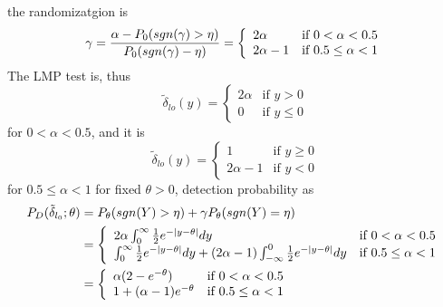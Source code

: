 \documentclass[a4paper,english,12pt]{article}
\begin{document}
the randomizatgion is 
\begin{equation*}
\gamma = \frac{\alpha - \mathnormal{P}_0(sgn(\gamma)>\eta)}{\mathnormal{P}_0(sgn(\gamma)-\eta)}=
\left\{
	\begin{array}{ll}
		2\alpha  & \mbox{if } 0<\alpha<0.5\\
		2\alpha -1 & \mbox{if } 0.5\leq \alpha < 1
	\end{array}
\right.
\end{equation*}
The LMP test is, thus
\begin{equation*}
\tilde{\delta}_{lo}(y) =
\left\{
	\begin{array}{ll}
		2\alpha  & \mbox{if } y>0\\
		0 & \mbox{if } y\leq 0
	\end{array}
\right.
\end{equation*}
for $0<\alpha < 0.5$, and it is
\begin{equation*}
\tilde{\delta}_{lo}(y) =
\left\{
	\begin{array}{ll}
		1  & \mbox{if } y\geq0\\
		2\alpha - 1 & \mbox{if } y< 0
	\end{array}
\right.
\end{equation*}
for $0.5\leq \alpha < 1$
for fixed $\theta>0$, detection probability as
\begin{align*}
\mathnormal{P}_D(\tilde{\delta}_{l_{0}};\theta) &=\mathnormal{P}_{\theta}(sgn(Y)>\eta)+\gamma \mathnormal{P}_{\theta}(sgn(Y)=\eta)\\
									&=\left\{
											\begin{array}{ll}
												2\alpha \int_0^{\infty}\frac{1}{2}e^{-| y-\theta|}dy  & \mbox{if } 0<\alpha<0.5\\
												\int_0^{\infty}\frac{1}{2}e^{-| y-\theta|}dy+(2\alpha-1)\int_{-\infty}^{0}\frac{1}{2}e^{-| y-\theta|}dy & \mbox{if } 0.5\leq \alpha < 1
											\end{array}
										\right.\\
									&=\left\{
											\begin{array}{ll}
												\alpha(2-e^{-\theta})  & \mbox{if } 0<\alpha<0.5\\
												1+(\alpha-1)e^{-\theta} & \mbox{if } 0.5\leq \alpha < 1
											\end{array}
										\right.
\end{align*}
\end{document}
